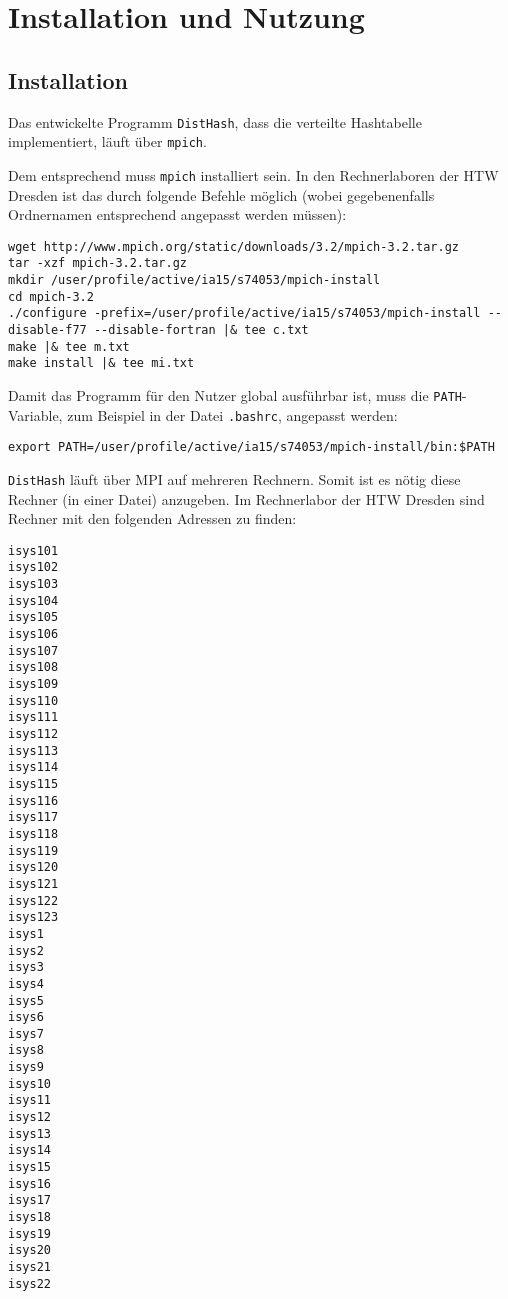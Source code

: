 \documentclass{scrreprt}
\begin{document}
\chapter{Installation und Nutzung}

\section{Installation}

Das entwickelte Programm \lstinline`DistHash`, dass die verteilte Hashtabelle implementiert, läuft über \lstinline`mpich`. 

Dem entsprechend muss \lstinline`mpich` installiert sein. In den Rechnerlaboren der HTW Dresden ist das durch folgende Befehle möglich (wobei gegebenenfalls Ordnernamen entsprechend angepasst werden müssen):
\begin{lstlisting}
wget http://www.mpich.org/static/downloads/3.2/mpich-3.2.tar.gz
tar -xzf mpich-3.2.tar.gz
mkdir /user/profile/active/ia15/s74053/mpich-install
cd mpich-3.2
./configure -prefix=/user/profile/active/ia15/s74053/mpich-install --disable-f77 --disable-fortran |& tee c.txt
make |& tee m.txt
make install |& tee mi.txt
\end{lstlisting}
Damit das Programm für den Nutzer global ausführbar ist, muss die \lstinline`PATH`-Variable, zum Beispiel in der Datei \lstinline`.bashrc`, angepasst werden:
\begin{lstlisting}
export PATH=/user/profile/active/ia15/s74053/mpich-install/bin:$PATH
\end{lstlisting}

\lstinline`DistHash` läuft über MPI auf mehreren Rechnern. Somit ist es nötig diese Rechner (in einer Datei) anzugeben. Im Rechnerlabor der HTW Dresden sind Rechner mit den folgenden Adressen zu finden:%
\begin{multicols}{4}%
\begin{lstlisting}[numbers=none]
isys101
isys102
isys103
isys104
isys105
isys106
isys107
isys108
isys109
isys110
isys111
isys112
isys113
isys114
isys115
isys116
isys117
isys118
isys119
isys120
isys121
isys122
isys123
isys1
isys2
isys3
isys4
isys5
isys6
isys7
isys8
isys9
isys10
isys11
isys12
isys13
isys14
isys15
isys16
isys17
isys18
isys19
isys20
isys21
isys22
\end{lstlisting}
\end{multicols}
\end{document}
